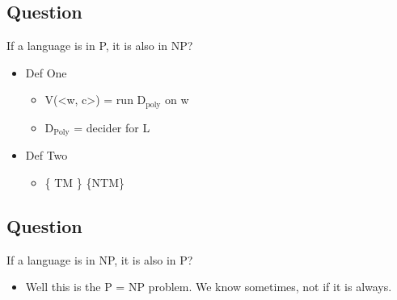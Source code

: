 \documentclass[11pt]{article}
\begin{document}
\subsection{Question}
\label{sec:org853a3dc}
If a language is in P, it is also in NP?
\begin{itemize}
\item Def One
\begin{itemize}
\item V(<w, c>) = run D\(_{\text{poly}}\) on w
\item D\(_{\text{Poly}}\) = decider for L
\end{itemize}
\item Def Two
\begin{itemize}
\item \{ TM \} \subseteq \{NTM\}
\end{itemize}
\end{itemize}
\subsection{Question}
\label{sec:orgd2687e3}
If a language is in NP, it is also in P?
\begin{itemize}
\item Well this is the P = NP problem. We know sometimes, not if it is always.
\end{itemize}
\end{document}
